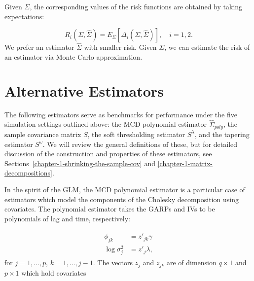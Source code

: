 \bigskip

Given $\Sigma$, the corresponding values of the risk functions are obtained by taking expectations:

\begin{equation*}
R_i \left(\Sigma,\hat{\Sigma}\right) = E_\Sigma\left[\Delta_i\left(\Sigma,\hat{\Sigma}\right)\right], \quad i = 1,2.
\end{equation*}
\noindent
We prefer an estimator $\hat{\Sigma}$ with smaller risk.  Given $\Sigma$, we can estimate the risk of an estimator via Monte Carlo approximation. 


\section{Alternative Estimators}
%
The following estimators serve as benchmarks for performance under the five simulation settings outlined above: the MCD polynomial estimator $\hat{\Sigma}_{poly}$, the sample covariance matrix $S$, the soft thresholding estimator $S^\lambda$, and the tapering estimator $S^\omega$. We will review the general definitions of these, but for detailed discussion of the construction and properties of these estimators, see Sections~\ref{chapter-1-shrinking-the-sample-cov} and \ref{chapter-1-matrix-decompositions}.

\bigskip

In the spirit of the GLM, the MCD polynomial estimator is a particular case of estimators which model the components of the Cholesky decomposition using covariates. The polynomial estimator takes the GARPs and IVs to be polynomials of lag and time, respectively:

\begin{align*}
\begin{split}  \label{eq:GARP-IV-parametric-model}
\phi_{jk} &= z'_{jk} \gamma \\
\log \sigma^2_{j} &= z'_{j}\lambda, 
\end{split}
\end{align*}
\noindent
for $j = 1,\dots, p$, $k = 1,\dots, j-1$. The vectors $z_j$ and $z_{jk}$ are of dimension $q \times 1$ and $p \times 1$  which hold covariates

